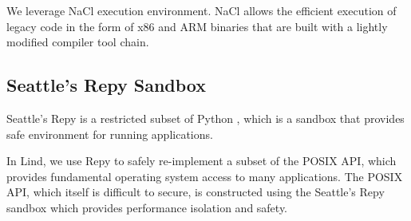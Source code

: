 We leverage NaCl execution environment. NaCl allows the efficient execution of legacy code in the form of x86 and ARM 
binaries that are built with a lightly modified compiler tool chain.

\subsection{Seattle's Repy Sandbox}

Seattle's Repy is a restricted subset of Python \cite{Repy:10}, which is a sandbox that provides safe environment for running 
applications.

In Lind, we use Repy to safely re-implement a subset of the POSIX API, which provides fundamental operating system 
access to many applications. The POSIX API, which itself is difficult to secure, is constructed using the Seattle's Repy 
sandbox which provides performance isolation and safety. 